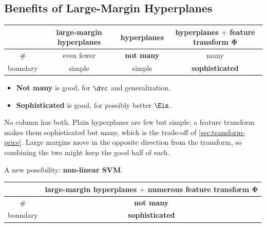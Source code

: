 \subsection{Benefits of Large-Margin Hyperplanes}

\begin{center}
    \solidrules
    \begin{tabular}{c|c|c|c}
        \toprule
        & large-margin hyperplanes & hyperplanes & hyperplanes \(+\) feature
            transform \(\bm{\Phi}\)\\
        \midrule
        \# & even fewer & \textbf{not many} & many\\
        boundary & simple & simple & \textbf{sophisticated}\\
        \bottomrule
    \end{tabular}
\end{center}

\begin{itemize}
    \item \textbf{Not many} is good, for \(\dvc\) and generalization.
    \item \textbf{Sophisticated} is good, for possibly better \(\Ein\).
\end{itemize}

No column has both. Plain hyperplanes are few but simple; a feature
transform makes them sophisticated but many, which is the trade-off of
\autoref{sec:transform-price}. Large margins move in the opposite direction
from the transform, so combining the two might keep the good half of each.

\begin{moral}
    A new possibility: \textbf{non-linear SVM}.
    \begin{center}
        \solidrules
        \begin{tabular}{c|c}
            \toprule
            & large-margin hyperplanes \(+\) numerous feature transform
                \(\bm{\Phi}\)\\
            \midrule
            \# & \textbf{not many}\\
            boundary & \textbf{sophisticated}\\
            \bottomrule
        \end{tabular}
    \end{center}
\end{moral}

